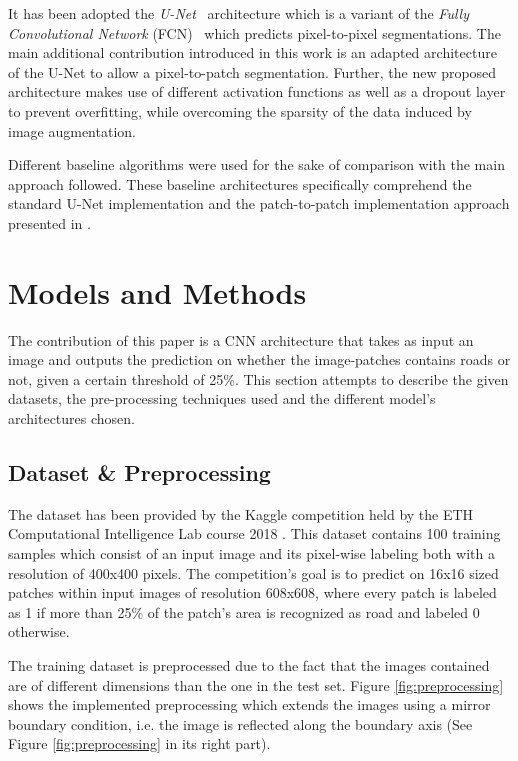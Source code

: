 \documentclass[10pt,conference,compsocconf]{IEEEtran}
\begin{document}
It has been adopted the \textit{U-Net}~\cite{Ronneberger2015} architecture which is a variant of the \textit{Fully Convolutional Network} (FCN)~\cite{Long2014} which predicts pixel-to-pixel segmentations. The main additional contribution introduced in this work is an adapted architecture of the U-Net to allow a pixel-to-patch segmentation. Further, the new proposed architecture makes use of different activation functions as well as a dropout layer to prevent overfitting, while overcoming the sparsity of the data induced by image augmentation.

Different baseline algorithms were used for the sake of comparison with the main approach followed. These baseline architectures specifically comprehend the standard U-Net implementation and the patch-to-patch implementation approach presented in \cite{Pavllo2017}.

\section{Models and Methods}

The contribution of this paper is a CNN architecture that takes as input an image and outputs the prediction on whether the image-patches contains roads or not, given a certain threshold of 25\%. This section attempts to describe the given datasets, the pre-processing techniques used and the different model’s architectures chosen.

\subsection{Dataset \& Preprocessing}

The dataset has been provided by the Kaggle competition held by the ETH Computational Intelligence Lab course 2018 \cite{KaggleCompetition}. This dataset contains 100 training samples which consist of an input image and its pixel-wise labeling both with a resolution of 400x400 pixels. The competition’s goal is to predict on 16x16 sized patches within input images of resolution 608x608, where every patch is labeled as 1 if more than 25\% of the patch’s area is recognized as road and labeled 0 otherwise.

The training dataset is preprocessed due to the fact that the images contained are of different dimensions than the one in the test set. Figure \ref{fig:preprocessing} shows the implemented preprocessing which extends the images using a mirror boundary condition, i.e. the image is reflected along the boundary axis (See Figure \ref{fig:preprocessing} in its right part).
\end{document}
